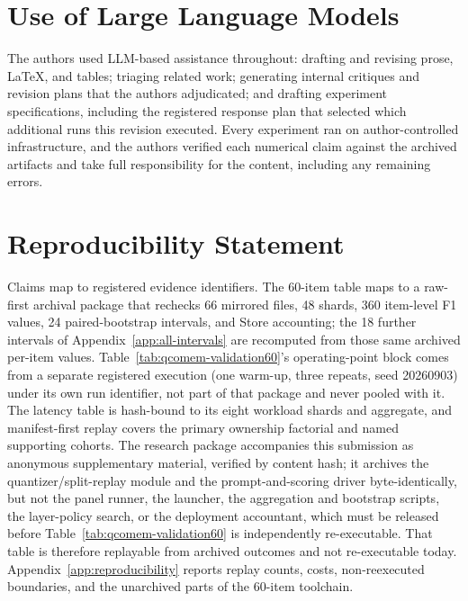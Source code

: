 \documentclass{article}
\begin{document}
\section*{Use of Large Language Models}
The authors used LLM-based assistance throughout: drafting and revising prose,
LaTeX, and tables; triaging related work; generating internal critiques and
revision plans that the authors adjudicated; and drafting experiment
specifications, including the registered response plan that selected which
additional runs this revision executed. Every experiment ran on
author-controlled infrastructure, and the authors verified each numerical claim
against the archived artifacts and take full responsibility for the content,
including any remaining errors.

\section*{Reproducibility Statement}
Claims map to registered evidence identifiers. The 60-item table maps to a
raw-first archival package that rechecks 66 mirrored files, 48 shards, 360
item-level F1 values, 24 paired-bootstrap intervals, and Store accounting; the
18 further intervals of Appendix~\ref{app:all-intervals} are recomputed from
those same archived per-item values.
Table~\ref{tab:qcomem-validation60}'s operating-point block comes from a
separate registered execution (one warm-up, three repeats, seed 20260903) under
its own run identifier, not part of that package and never pooled with it. The
latency table is hash-bound to its eight workload shards and aggregate, and
manifest-first replay covers the primary ownership factorial and named
supporting cohorts. The research package accompanies this submission as
anonymous supplementary material, verified by content hash; it archives the
quantizer/split-replay module and the prompt-and-scoring driver
byte-identically, but not the panel runner, the launcher, the aggregation and
bootstrap scripts, the layer-policy search, or the deployment accountant, which
must be released before Table~\ref{tab:qcomem-validation60} is independently
re-executable. That table is therefore replayable from archived outcomes and not
re-executable today. Appendix~\ref{app:reproducibility} reports replay counts,
costs, non-reexecuted boundaries, and the unarchived parts of the 60-item
toolchain.




\appendix
\end{document}
